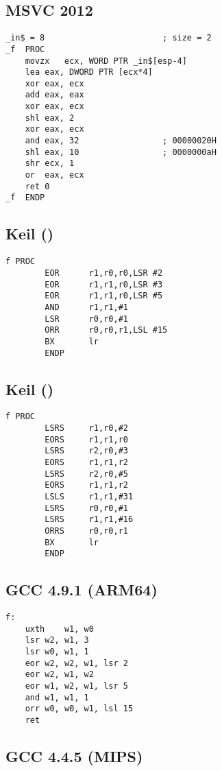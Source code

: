 \subsection{\Optimizing MSVC 2012}

\begin{lstlisting}
_in$ = 8						; size = 2
_f	PROC
	movzx	ecx, WORD PTR _in$[esp-4]
	lea	eax, DWORD PTR [ecx*4]
	xor	eax, ecx
	add	eax, eax
	xor	eax, ecx
	shl	eax, 2
	xor	eax, ecx
	and	eax, 32					; 00000020H
	shl	eax, 10					; 0000000aH
	shr	ecx, 1
	or	eax, ecx
	ret	0
_f	ENDP
\end{lstlisting}

\subsection{Keil (\ARMMode)}

\begin{lstlisting}
f PROC
        EOR      r1,r0,r0,LSR #2
        EOR      r1,r1,r0,LSR #3
        EOR      r1,r1,r0,LSR #5
        AND      r1,r1,#1
        LSR      r0,r0,#1
        ORR      r0,r0,r1,LSL #15
        BX       lr
        ENDP
\end{lstlisting}

\subsection{Keil (\ThumbMode)}

\begin{lstlisting}
f PROC
        LSRS     r1,r0,#2
        EORS     r1,r1,r0
        LSRS     r2,r0,#3
        EORS     r1,r1,r2
        LSRS     r2,r0,#5
        EORS     r1,r1,r2
        LSLS     r1,r1,#31
        LSRS     r0,r0,#1
        LSRS     r1,r1,#16
        ORRS     r0,r0,r1
        BX       lr
        ENDP
\end{lstlisting}

\subsection{\Optimizing GCC 4.9.1 (ARM64)}

\begin{lstlisting}
f:
	uxth	w1, w0
	lsr	w2, w1, 3
	lsr	w0, w1, 1
	eor	w2, w2, w1, lsr 2
	eor	w2, w1, w2
	eor	w1, w2, w1, lsr 5
	and	w1, w1, 1
	orr	w0, w0, w1, lsl 15
	ret
\end{lstlisting}

\subsection{\Optimizing GCC 4.4.5 (MIPS)}

